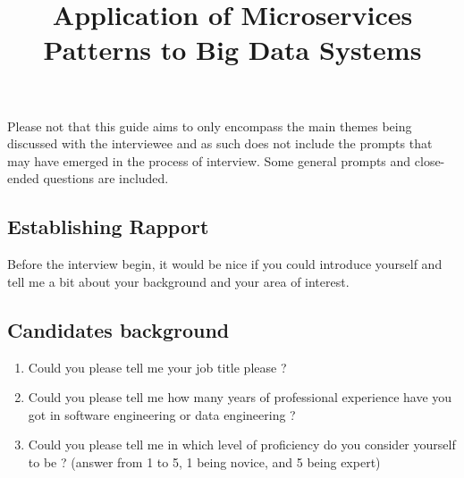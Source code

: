 \documentclass[conference]{IEEEtran}
\begin{document}
\title{Application of Microservices Patterns to Big Data Systems\\
}

\author{
\and
{}
}

\maketitle

Please not that this guide aims to only encompass the main themes being discussed with the interviewee and as such does not include the prompts that may have emerged in the process of interview. Some general prompts and close-ended questions are included.


\subsection{\textbf{Establishing Rapport}}

Before the interview begin, it would be nice if you could introduce yourself and tell me a bit about your background and your area of interest. 

\subsection{\textbf{Candidates background}}

\begin{enumerate}
    \item Could you please tell me your job title please ? 
    \item Could you please tell me how many years of professional experience have you got in software engineering or data engineering ? 
    \item Could you please tell me in which level of proficiency do you consider yourself to be ? (answer from 1 to 5, 1 being novice, and 5 being expert)
\end{enumerate}
\end{document}
